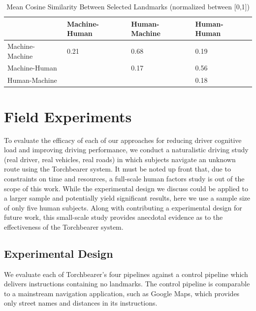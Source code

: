 \begin{table}[htbp]
  \centering
  \caption{Mean Cosine Similarity Between Selected Landmarks (normalized between [0,1])}
  \label{tab:descriptionsimilarity}
  {\tabulinesep=2mm
    \begin{singlespace}
    \begin{tabu} to \textwidth{|X[c]||X[c]|X[c]|X[c]|}
    \hline
                & Machine-Human & Human-Machine & Human-Human \\
                \hline\hline
Machine-Machine & 0.21 & 0.68 & 0.19 \\
    \hline
Machine-Human   &      & 0.17 & 0.56 \\
    \hline
Human-Machine   &      &      & 0.18
\\
    \hline
    \end{tabu}
    \end{singlespace}
    }
\end{table}

\section{Field Experiments}

To evaluate the efficacy of each of our approaches for reducing driver cognitive load and improving driving performance, we conduct a naturalistic driving study (real driver, real vehicles, real roads) in which subjects navigate an unknown route using the Torchbearer system. It must be noted up front that, due to constraints on time and resources, a full-scale human factors study is out of the scope of this work. While the experimental design we discuss could be applied to a larger sample and potentially yield significant results, here we use a sample size of only five human subjects. Along with contributing a experimental design for future work, this small-scale study provides anecdotal evidence as to the effectiveness of the Torchbearer system.

\subsection{Experimental Design}

We evaluate each of Torchbearer's four pipelines against a control pipeline which delivers instructions containing no landmarks. The control pipeline is comparable to a mainstream navigation application, such as Google Maps, which provides only street names and distances in its instructions.

